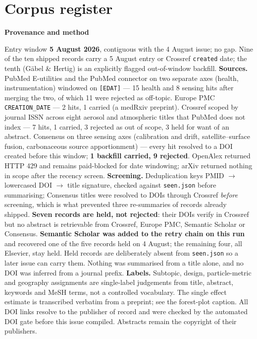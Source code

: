 \documentclass[10pt]{article}
\begin{document}
\clearpage

\section*{\sffamily\bfseries\color{Deep}Corpus register}
\vspace{-1.5mm}{\color{Amber}\rule{\linewidth}{1.1pt}}\vspace{2.5mm}



\vspace{4mm}
\begin{keybox}
{\sffamily\bfseries\footnotesize\color{Deep}Provenance and method}\\[1.2mm]
{\fontsize{7.2}{8.8}\selectfont
Entry window \textbf{5 August 2026}, contiguous with the 4 August issue; no gap. Nine of
the ten shipped records carry a 5 August entry or Crossref \texttt{created} date; the
tenth (G\"abel \& Hertig) is an explicitly flagged out-of-window backfill.
\textbf{Sources.} PubMed E-utilities and the PubMed connector on two separate axes
(health, instrumentation) windowed on \texttt{[EDAT]} --- 15 health and 8 sensing hits
after merging the two, of which 11 were rejected as off-topic. Europe PMC
\texttt{CREATION\_DATE} --- 2 hits, 1 carried (a medRxiv preprint). Crossref scoped by
journal ISSN across eight aerosol and atmospheric titles that PubMed does not index ---
7 hits, 1 carried, 3 rejected as out of scope, 3 held for want of an abstract. Consensus
on three sensing axes (calibration and drift, satellite--surface fusion, carbonaceous
source apportionment) --- every hit resolved to a DOI created before this window;
\textbf{1 backfill carried, 9 rejected}. OpenAlex returned HTTP 429 and remains
paid-blocked for date windowing; arXiv returned nothing in scope after the recency screen.
\textbf{Screening.} Deduplication keys PMID $\rightarrow$ lowercased DOI $\rightarrow$
title signature, checked against \texttt{seen.json} before summarising; Consensus titles
were resolved to DOIs through Crossref \emph{before} screening, which is what prevented
three re-summaries of records already shipped. \textbf{Seven records are held, not
rejected}: their DOIs verify in Crossref but no abstract is retrievable from Crossref,
Europe PMC, Semantic Scholar or Consensus. \textbf{Semantic Scholar was added to the
retry chain on this run} and recovered one of the five records held on 4 August; the
remaining four, all Elsevier, stay held. Held records are deliberately absent from
\texttt{seen.json} so a later issue can carry them. Nothing was summarised from a title
alone, and no DOI was inferred from a journal prefix.
\textbf{Labels.} Subtopic, design, particle-metric and geography assignments are
single-label judgements from title, abstract, keywords and MeSH terms, not a controlled
vocabulary. The single effect estimate is transcribed verbatim from a preprint; see the
forest-plot caption.
All DOI links resolve to the publisher of record and were checked by the automated DOI
gate before this issue compiled. Abstracts remain the copyright of their publishers.\par}
\end{keybox}
\end{document}
